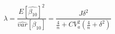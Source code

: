 \begin{equation}
\label{eq:lambda}
\lambda = \frac{E[\hat{\beta_{10}}]^2}{\hat{var}[{\beta_{10}}]} = \frac{J\delta^2}{\frac{4}{n}+CV_{a}^2(\frac{4}{n} + \delta^2)}
\end{equation}